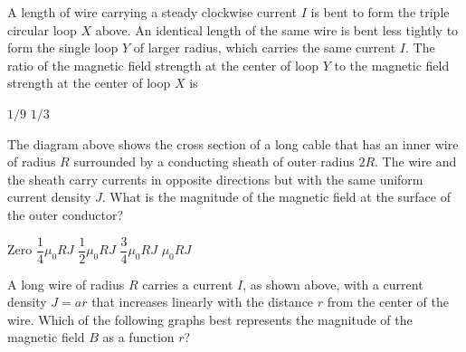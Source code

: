 \documentclass[12pt]{../oss-classkick-exam}
\begin{document}
\begin{questions}
  \question A length of wire carrying a steady clockwise current $I$ is bent
  to form the triple circular loop $X$ above. An identical length of the same
  wire is bent less tightly to form the single loop $Y$ of larger radius, which
  carries the same current $I$. The ratio of the magnetic field strength at the
  center of loop $Y$ to the magnetic field strength at the center of loop $X$ is
  \begin{choices}
    \choice $1/9$
    \choice $1/3$
  \end{choices}
  
  \question The diagram above shows the cross section of a long cable that has
  an inner wire of radius $R$ surrounded by a conducting sheath of outer radius
  $2R$. The wire and the sheath carry currents in opposite directions but with
  the same uniform current density $J$. What is the magnitude of the magnetic
  field at the surface of the outer conductor?
  \begin{choices}
    \choice Zero
    \choice $\dfrac14\mu_0RJ$
    \choice $\dfrac12\mu_0RJ$
    \choice $\dfrac34\mu_0RJ$
    \choice $\mu_0RJ$
  \end{choices}

  \question A long wire of radius $R$ carries a current $I$, as
  shown above, with a current density $J=ar$ that increases linearly with the
  distance $r$ from the center of the wire. Which of the following graphs best
  represents the magnitude of the magnetic field $B$ as a function $r$?

  \begin{oneparchoices}
    \choice

    \choice


\end{oneparchoices}
\end{questions}
\end{document}
